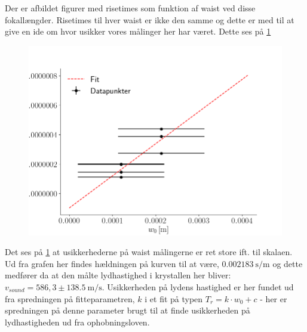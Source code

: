 \documentclass[main]{subfiles}
\begin{document}
Der er afbildet figurer med risetimes som funktion af waist ved disse fokallængder. Risetimes til hver waist er ikke den samme og dette er med til at give en ide om hvor usikker vores målinger her har været. Dette ses på \cref{fig:risetime_fig}
\begin{figure}[H]
  \includegraphics[width=\linewidth]{tegninger/risetime_fig.png}
  \caption{}
  \label{fig:risetime_fig}
\end{figure}
Det ses på \cref{fig:risetime_fig} at usikkerhederne på waist målingerne er ret store ift. til skalaen. Ud fra grafen her findes hældningen på kurven til at være, $\SI{0,002183}{\second\per\meter}$ og dette medfører da at den målte lydhastighed i krystallen her bliver: $v_{sound} = 586,3 \pm 138.5 \ \si{\meter\per\second}$. Usikkerheden på lydens hastighed er her fundet ud fra spredningen på fitteparametren, $k$ i et fit på typen $T_r = k\cdot w_0 +c $ - her er spredningen på denne parameter brugt til at finde usikkerheden på lydhastigheden ud fra ophobningsloven.
\end{document}

